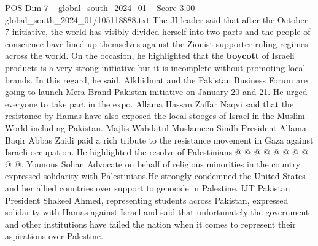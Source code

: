 \begin{textsample}{POS Dim 7 – global\_south\_2024\_01 – Score 3.00 – global\_south\_2024\_01/105118888.txt}
The JI leader said that after the October 7 initiative, the world has visibly divided herself into two parts and the people of conscience have lined up themselves against the Zionist supporter ruling regimes across the world.
On the occasion, he highlighted that the \textbf{boycott} of Israeli products is a very strong initiative but it is incomplete without promoting local brands.
In this regard, he said, Alkhidmat and the Pakistan Business Forum are going to launch Mera Brand Pakistan initiative on January 20 and 21.
He urged everyone to take part in the expo.
Allama Hassan Zaffar Naqvi said that the resistance by Hamas have also exposed the local stooges of Israel in the Muslim World including Pakistan.
Majlis Wahdatul Muslameen Sindh President Allama Baqir Abbas Zaidi paid a rich tribute to the resistance movement in Gaza against Israeli occupation.
He highlighted the resolve of Palestinians @ @ @ @ @ @ @ @ @ @.
Younous Sohan Advocate on behalf of religious minorities in the country expressed solidarity with Palestinians.He strongly condemned the United States and her allied countries over support to genocide in Palestine.
IJT Pakistan President Shakeel Ahmed, representing students across Pakistan, expressed solidarity with Hamas against Israel and said that unfortunately the government and other institutions have failed the nation when it comes to represent their aspirations over Palestine.

\end{textsample}
